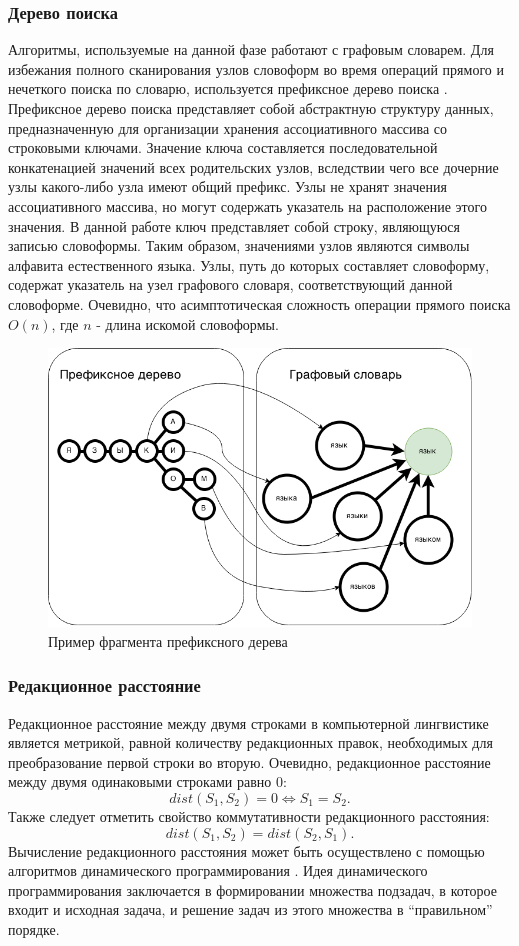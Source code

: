 \subsubsection{Дерево поиска}
Алгоритмы, используемые на данной фазе работают с графовым словарем. Для избежания полного сканирования узлов словоформ во время операций прямого и нечеткого поиска по словарю, используется префиксное дерево поиска \cite{knuth}. Префиксное дерево поиска представляет собой абстрактную структуру данных, предназначенную для организации хранения ассоциативного массива со строковыми ключами. Значение ключа составляется последовательной конкатенацией значений всех родительских узлов, вследствии чего все дочерние узлы какого-либо узла имеют общий префикс. Узлы не хранят значения ассоциативного массива, но могут содержать указатель на расположение этого значения. В данной работе ключ представляет собой строку, являющуюся записью словоформы. Таким образом, значениями узлов являются символы алфавита естественного языка. Узлы, путь до которых составляет словоформу, содержат указатель на узел графового словаря, соответствующий данной словоформе. Очевидно, что асимптотическая сложность операции прямого поиска \(O(n)\), где \(n\) - длина искомой словоформы.
\begin{figure}[H]
	\centering
	\includegraphics[scale=0.6]{img/prefixtree.png}
	\caption{Пример фрагмента префиксного дерева}
\end{figure}

\subsubsection{Редакционное расстояние}
Редакционное расстояние между двумя строками в компьютерной лингвистике является метрикой, равной количеству редакционных правок, необходимых для преобразование первой строки во вторую. Очевидно, редакционное расстояние между двумя одинаковыми строками равно \(0\):
\[ dist(S_1, S_2) = 0 \Leftrightarrow S_1 = S_2\text{.}\]
Также следует отметить свойство коммутативности редакционного расстояния:
\[ dist(S_1, S_2) = dist(S_2, S_1)\text{.}\]
Вычисление редакционного расстояния может быть осуществлено с помощью алгоритмов динамического программирования \cite{dasgupta}. Идея динамического программирования заключается в формировании множества подзадач, в которое входит и исходная задача, и решение задач из этого множества в ``правильном'' порядке. 

